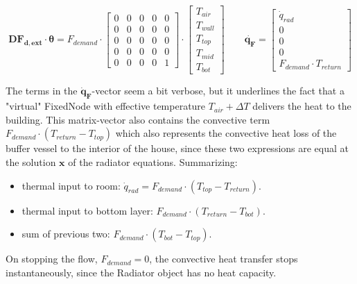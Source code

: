 \begin{equation}
	\mathbf{DF_{d, ext}} \cdot \boldsymbol{\theta} = 
	F_{demand} \cdot
	\begin{bmatrix}
		0 & 0 & 0 & 0 & 0 \\
		0 & 0 & 0 & 0 & 0 \\
		0 & 0 & 0 & 0 & 0 \\
		0 & 0 & 0 & 0 & 0 \\
		0 & 0 & 0 & 0 & 1  
	\end{bmatrix}
	\cdot
	\begin{bmatrix}
		T_{air} \\
		T_{wall} \\
		T_{top} \\
		T_{mid} \\
		T_{bot}
	\end{bmatrix}
    \qquad
    \mathbf{\dot{q_{F}}} = 
    \begin{bmatrix}
        \dot{q}_{rad} \\
    	0 \\
    	0 \\
    	0 \\
    	F_{demand} \cdot T_{return}  
    \end{bmatrix}
\end{equation}

The terms in the $\mathbf{\dot{q}_F}$-vector seem a bit verbose, but it underlines the fact that a "virtual" \textsf{FixedNode} with effective temperature $T_{air} + \Delta T$ delivers the heat to the building.
This matrix-vector also contains the convective term $F_{demand} \cdot (T_{return} - T_{top})$ which also represents the convective heat loss of the buffer vessel to the interior of the house, since these two expressions are equal at the solution $\mathbf{x}$ of the radiator equations. Summarizing:

\begin{itemize}
	\item thermal input to room: $\dot{q}_{rad} = F_{demand} \cdot (T_{top} - T_{return})$.
	\item thermal input to bottom layer: $F_{demand} \cdot (T_{return} - T_{bot})$.
	\item sum of previous two: $F_{demand} \cdot (T_{bot} - T_{top})$.
\end{itemize}

On stopping the flow, $F_{demand} = 0 $, the convective heat transfer stops instantaneously, since the \textsf{Radiator} object has no heat capacity.


